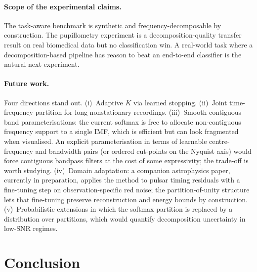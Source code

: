 \documentclass[journal]{IEEEtran}
\theoremstyle{remark}
\begin{document}
\paragraph{Scope of the experimental claims.}
The task-aware benchmark is synthetic and frequency-decomposable by
construction. The pupillometry experiment is a decomposition-quality
transfer result on real biomedical data but no classification win. A
real-world task where a decomposition-based pipeline has reason to
beat an end-to-end classifier is the natural next experiment.

\paragraph{Future work.}
Four directions stand out. (i)~Adaptive $K$ via learned stopping.
(ii)~Joint time-frequency partition for long nonstationary recordings.
(iii)~Smooth contiguous-band parameterisations: the current softmax is
free to allocate non-contiguous frequency support to a single IMF,
which is efficient but can look fragmented when visualised. An
explicit parameterisation in terms of learnable centre-frequency and
bandwidth pairs (or ordered cut-points on the Nyquist axis) would
force contiguous bandpass filters at the cost of some expressivity;
the trade-off is worth studying. (iv)~Domain adaptation: a companion
astrophysics paper, currently in preparation, applies the method to
pulsar timing residuals with a fine-tuning step on observation-specific
red noise; the partition-of-unity structure lets that fine-tuning
preserve reconstruction and energy bounds by construction.
(v)~Probabilistic extensions in which the softmax partition is
replaced by a distribution over partitions, which would quantify
decomposition uncertainty in low-SNR regimes.

\section{Conclusion}
\label{sec:conclusion}
\end{document}
